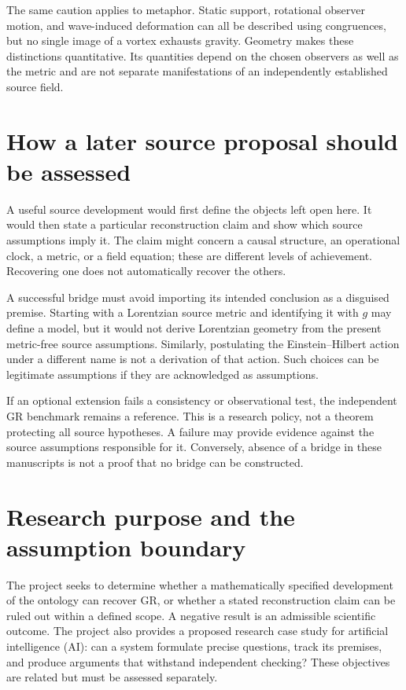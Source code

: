 \documentclass[11pt,oneside]{report}
\theoremstyle{remark}
\numberwithin{definition}{chapter}
\numberwithin{proposition}{chapter}
\numberwithin{remark}{chapter}
\begin{document}
The same caution applies to metaphor. Static support, rotational observer motion, and wave-induced deformation can all be described using congruences, but no single image of a vortex exhausts gravity. Geometry makes these distinctions quantitative. Its quantities depend on the chosen observers as well as the metric and are not separate manifestations of an independently established source field.

\section{How a later source proposal should be assessed}
A useful source development would first define the objects left open here. It would then state a particular reconstruction claim and show which source assumptions imply it. The claim might concern a causal structure, an operational clock, a metric, or a field equation; these are different levels of achievement. Recovering one does not automatically recover the others.

A successful bridge must avoid importing its intended conclusion as a disguised premise. Starting with a Lorentzian source metric and identifying it with $g$ may define a model, but it would not derive Lorentzian geometry from the present metric-free source assumptions. Similarly, postulating the Einstein--Hilbert action under a different name is not a derivation of that action. Such choices can be legitimate assumptions if they are acknowledged as assumptions.

If an optional extension fails a consistency or observational test, the independent GR benchmark remains a reference. This is a research policy, not a theorem protecting all source hypotheses. A failure may provide evidence against the source assumptions responsible for it. Conversely, absence of a bridge in these manuscripts is not a proof that no bridge can be constructed.

\section{Research purpose and the assumption boundary}
The project seeks to determine whether a mathematically specified development of the ontology can recover GR, or whether a stated reconstruction claim can be ruled out within a defined scope. A negative result is an admissible scientific outcome. The project also provides a proposed research case study for artificial intelligence (AI): can a system formulate precise questions, track its premises, and produce arguments that withstand independent checking? These objectives are related but must be assessed separately.
\end{document}
